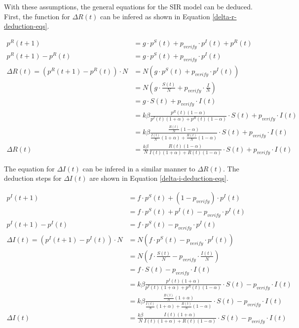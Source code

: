 With these assumptions, the general equations for the SIR model can 
be deduced. First, the function for $\Delta R(t)$ can be infered
as shown in Equation \ref{delta-r-deduction-eqs}.

\begin{align}
    p^R(t+1) &= g \cdot p^S(t) + p_{verify}\cdot p^I(t) + p^R(t) \nonumber\\
    p^R(t+1) - p^R(t) &= g \cdot p^S(t) + p_{verify}\cdot p^I(t) \nonumber\\
    \Delta R(t) = (p^R(t+1) - p^R(t))\cdot N 
    &= N(g \cdot p^S(t) + p_{verify}\cdot p^I(t)) \nonumber\\
    &= N(g \cdot \frac{S(t)}{N} + p_{verify}\cdot \frac{I}{N} ) \nonumber\\
    &= g \cdot S(t) + p_{verify}\cdot I(t) \nonumber\\
    &= k\beta \frac{p^R(t)(1-\alpha)}{p^I(t)(1+\alpha)+p^R(t)(1-\alpha)} 
    \cdot S(t) + p_{verify}\cdot I(t) \nonumber\\
    &= k\beta \frac{\frac{R(t)}{N}(1-\alpha)}{\frac{I(t)}{N}(1+\alpha)+\frac{R(t)}{N}(1-\alpha)} 
    \cdot S(t) + p_{verify}\cdot I(t) \nonumber\\
    \Delta R(t) &= \frac{k\beta}{N} \frac{R(t)(1-\alpha)}{I(t)(1+\alpha)+R(t)(1-\alpha)} 
    \cdot S(t) + p_{verify}\cdot I(t) \label{delta-r-deduction-eqs}
\end{align}

The equation for $\Delta I(t)$ can be infered in a similar manner to $\Delta R(t)$.
The deduction steps for $\Delta I(t)$ are shown in Equation 
\ref{delta-i-deduction-eqs}.

\begin{align}
    p^I(t+1) &= f \cdot p^S(t) + (1 - p_{verify})\cdot p^I(t) \nonumber\\
     &= f \cdot p^S(t) + p^I(t) - p_{verify}\cdot p^I(t) \nonumber\\
    p^I(t+1) - p^I(t) &= f \cdot p^S(t) - p_{verify}\cdot p^I(t) \nonumber\\
    \Delta I(t) = (p^I(t+1) - p^I(t)) \cdot N 
    &= N (f \cdot p^S(t) - p_{verify}\cdot p^I(t)) \nonumber\\
    &= N (f \cdot \frac{S(t)}{N}  - p_{verify}\cdot \frac{I(t)}{N}) \nonumber\\
    &= f \cdot S(t) - p_{verify}\cdot I(t) \nonumber\\
    &=  k\beta \frac{p^I(t)(1+\alpha)}{p^I(t)(1+\alpha)+p^R(t)(1-\alpha)}
     \cdot S(t) - p_{verify}\cdot I(t) \nonumber\\
    &=  k\beta \frac{\frac{B(t)}{N}(1+\alpha)}{\frac{I(t)}{N}(1+\alpha)+\frac{R(t)}{N}(1-\alpha)}
     \cdot S(t) - p_{verify}\cdot I(t) \nonumber\\
     \Delta I(t) &=  \frac{k\beta}{N} \frac{I(t)(1+\alpha)}{I(t)(1+\alpha)+R(t)(1-\alpha)}
     \cdot S(t) - p_{verify}\cdot I(t) \label{delta-i-deduction-eqs}
\end{align}

